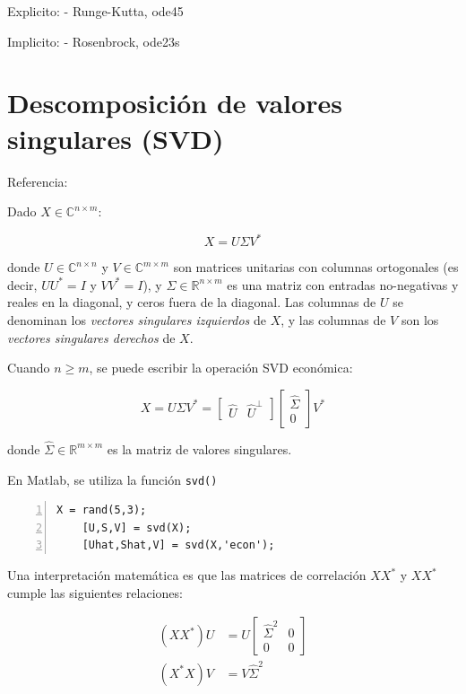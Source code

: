 Explicito:
- Runge-Kutta, ode45

Implicito:
- Rosenbrock, ode23s

\section{Descomposición de valores singulares (SVD)}

Referencia: \textcite[Cap. 1]{brunton_data-driven_2019}

Dado $X \in \mathbb{C}^{n \times m}$:

\begin{equation}
    X = U \Sigma V^*
\end{equation}

\noindent donde $U  \in \mathbb{C}^{n \times n} $ y $V \in \mathbb{C}^{m \times m}$ son matrices unitarias con columnas ortogonales (es decir, $U U^* = I$ y $V V^* = I$), y $\Sigma \in \mathbb{R}^{n \times m}$ es una matriz con entradas no-negativas y reales en la diagonal, y ceros fuera de la diagonal. Las columnas de $U$ se denominan los \emph{vectores singulares izquierdos} de $X$, y las columnas de $V$ son los \emph{vectores singulares derechos} de $X$.

Cuando $n \geq m$, se puede escribir la operación SVD económica:

\begin{equation}
    X = U \Sigma V^* =
    \begin{bmatrix}
        \hat{U} & \hat{U}^{\perp}    
    \end{bmatrix}
    \begin{bmatrix}
        \hat{\Sigma} \\ 0    
    \end{bmatrix}
    V^*
\end{equation}

donde $\hat{\Sigma} \in \mathbb{R}^{m \times m}$ es la matriz de valores singulares.

En Matlab, se utiliza la función \texttt{svd()}

\begin{lstlisting}[style=Matlab-editor,frame=single,numbers=left]
    X = rand(5,3);
    [U,S,V] = svd(X);
    [Uhat,Shat,V] = svd(X,'econ');
\end{lstlisting}

Una interpretación matemática es que las matrices de correlación $X X^*$ y $X X^*$ cumple las siguientes relaciones:

\begin{align}
    (X X^*) U & = U \begin{bmatrix} \hat{\Sigma}^2 & 0 \\ 0 & 0\end{bmatrix}\\
    (X^* X) V & = V \hat{\Sigma}^2\\
\end{align}


